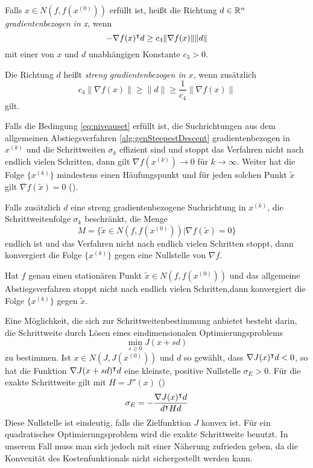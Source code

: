 Falls $x\in N(f,f(x^{(0)}))$ erfüllt ist, heißt die Richtung $d\in \mathbb{R}^n$ \textit{gradientenbezogen in x}, wenn
 \[
  -\nabla f(x)^\intercal d\geq c_3\|\nabla f(x)\| \|d\|
 \]
mit einer von $x$ und $d$ unabhängigen Konstante $c_3>0$.

Die Richtung $d$ heißt \textit{streng gradientenbezogen in $x$}, wenn zusätzlich 
\[
 c_4\|\nabla f(x)\| \geq \|d\| \geq \frac{1}{c_4}\|\nabla f(x)\| 
\]
gilt.

Falls die Bedingung \eqref{eq:niveauset} erfüllt ist, die Suchrichtungen aus dem allgemeinen Abstiegsverfahren \ref{alg:genSteepestDescent} gradientenbezogen in $x^{(k)}$ und die Schrittweiten $\sigma_k$ effizient sind und stoppt das Verfahren nicht nach endlich vielen Schritten, dann gilt $\nabla f(x^{(k)})\to 0$ für $k\to \infty$. Weiter hat die Folge $\{x^{(k)}\}$ mindestens einen Häufungspunkt und für jeden solchen Punkt $\tilde x$ gilt $\nabla f(\tilde x) = 0$ (\cite[Satz 4.4.9]{alt2002nichtlineare}).

Falls zusätzlich $d$ eine streng gradientenbezogene Suchrichtung in $x^{(k)}$, die Schrittweitenfolge $\sigma_k$ beschränkt, die Menge 
$$M = \{\tilde x\in N(f,f(x^{(0)}))|\nabla f(\tilde x)=0\}$$ endlich ist und das Verfahren nicht nach endlich vielen Schritten stoppt, dann konvergiert die Folge $\{x^{(k)}\}$ gegen eine Nullstelle von $\nabla f$.

Hat $f$ genau einen stationären Punkt $\tilde x \in N(f,f(x^{(0)}))$ und das allgemeine Abstiegsverfahren stoppt nicht nach endlich vielen Schritten,dann konvergiert die Folge $\{x^{(k)}\}$ gegen $\tilde x$.
 
Eine Möglichkeit, die sich zur Schrittweitenbestimmung anbietet besteht darin, die Schrittweite durch Lösen eines eindimensionalen Optimierungsproblems
\[
 \min_{s\geq 0} J(x+sd)
\]
zu bestimmen. Ist $x\in N(J,J(x^{(0)}))$ und $d$ so gewählt, dass $\nabla J(x)^\intercal d <0$, so hat die Funktion $\nabla J(x+sd)^\intercal d$ eine kleinste, positive Nullstelle $\sigma_E>0$. Für die exakte Schrittweite gilt mit $H = J''(x)$ (\cite[Gleichung (4.5.5)]{alt2002nichtlineare})
\[
 \sigma_E = -\frac{\nabla J(x)^\intercal d}{d^\intercal H d}
\]
Diese Nullstelle ist eindeutig, falls die Zielfunktion $J$ konvex ist. Für ein quadratisches Optimierungsproblem wird die exakte Schrittweite benutzt. In unserem Fall muss man sich jedoch mit einer Näherung zufrieden geben, da die Konvexität des Kostenfunktionals nicht sichergestellt werden kann. 
 
